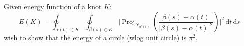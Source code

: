 \documentclass[a4paper]{article}
\DeclareMathOperator{\proj}{Proj}
\newcommand{\diff}[1]{\, \text{d}#1}
\begin{document}
Given energy function of a knot $K$:
\begin{equation}
    E(K) = \oint_{\alpha(t) \in K} \oint_{\beta(s) \in K} \Bigg| \proj_{N_{\alpha'(t)}} \left( \frac{\beta(s) - \alpha(t)}{|\beta(s) - \alpha(t)|^2} \right) \Bigg|^2 \diff{t} \diff{s}
\end{equation}
wish to show that the energy of a circle (wlog unit circle) is $\pi^2$.
\end{document}
